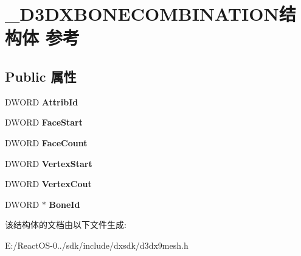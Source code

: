 \hypertarget{struct___d3_d_x_b_o_n_e_c_o_m_b_i_n_a_t_i_o_n}{}\section{\+\_\+\+D3\+D\+X\+B\+O\+N\+E\+C\+O\+M\+B\+I\+N\+A\+T\+I\+O\+N结构体 参考}
\label{struct___d3_d_x_b_o_n_e_c_o_m_b_i_n_a_t_i_o_n}
\subsection*{Public 属性}
\begin{DoxyCompactItemize}
\item 
\mbox{\label{struct___d3_d_x_b_o_n_e_c_o_m_b_i_n_a_t_i_o_n_afda230d74661194c84eb00daedf99070}} 
D\+W\+O\+RD {\bfseries Attrib\+Id}
\item 
\mbox{\label{struct___d3_d_x_b_o_n_e_c_o_m_b_i_n_a_t_i_o_n_a52ad4d56f4602a7c0b5c7ab5c33e411b}} 
D\+W\+O\+RD {\bfseries Face\+Start}
\item 
\mbox{\label{struct___d3_d_x_b_o_n_e_c_o_m_b_i_n_a_t_i_o_n_ad65ceb90e0f3c1960deee6ef6e66e20d}} 
D\+W\+O\+RD {\bfseries Face\+Count}
\item 
\mbox{\label{struct___d3_d_x_b_o_n_e_c_o_m_b_i_n_a_t_i_o_n_a871341998884f9619b30f06669878c8e}} 
D\+W\+O\+RD {\bfseries Vertex\+Start}
\item 
\mbox{\label{struct___d3_d_x_b_o_n_e_c_o_m_b_i_n_a_t_i_o_n_adc1e307147e6a9c46e9446a2b1dc664f}} 
D\+W\+O\+RD {\bfseries Vertex\+Cout}
\item 
\mbox{\label{struct___d3_d_x_b_o_n_e_c_o_m_b_i_n_a_t_i_o_n_a386c7c716eded9c820ab0c3c582d10ca}} 
D\+W\+O\+RD $\ast$ {\bfseries Bone\+Id}
\end{DoxyCompactItemize}


该结构体的文档由以下文件生成\+:\begin{DoxyCompactItemize}
\item 
E\+:/\+React\+O\+S-\/0../sdk/include/dxsdk/d3dx9mesh.\+h\end{DoxyCompactItemize}
